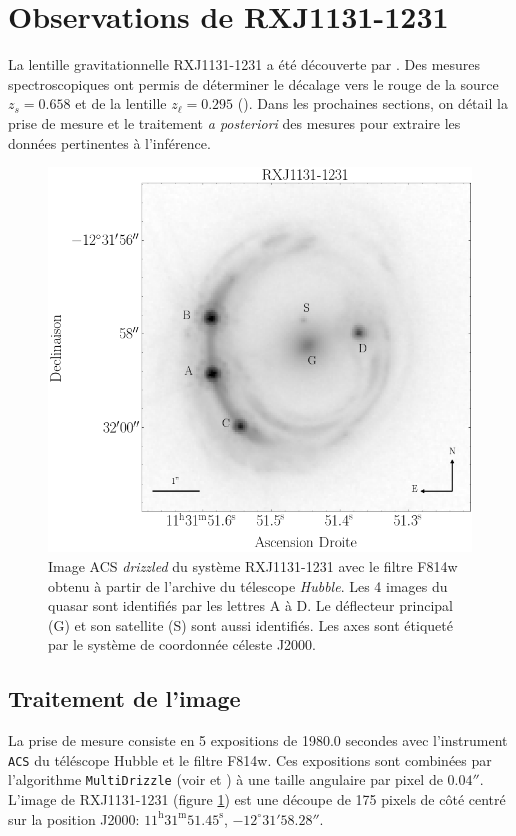 \documentclass[times,10pt,twocolumn]{article}
\begin{document}
\section{Observations de RXJ1131-1231}\label{sec:observation}
La lentille gravitationnelle RXJ1131-1231 a été découverte par 
\citet{Sluse2003}. Des mesures spectroscopiques ont permis de déterminer le 
décalage vers le rouge de la source $z_s = 0.658$ et de la lentille 
$z_\ell = 0.295$ (\citet{Sluse2003}). Dans les prochaines sections, on détail 
la prise de mesure et le traitement \textit{a posteriori} des mesures pour 
extraire les données pertinentes à l'inférence.
\begin{figure}[H]
        \centering
        \includegraphics[width=\linewidth]{good_cutout}
        \caption{Image ACS \textit{drizzled} du système RXJ1131-1231 avec le filtre F814w obtenu 
                à partir de l'archive du télescope \textit{Hubble}. Les 
        4 images du quasar sont identifiés par les lettres A à D. Le déflecteur principal (G) 
        et son satellite (S) sont aussi identifiés. Les axes sont étiqueté par le système 
        de coordonnée céleste J2000.}
        \label{fig:rxj1131}
\end{figure}

\subsection{Traitement de l'image}
La prise de mesure consiste en 5 expositions de 1980.0 secondes avec 
l'instrument \texttt{ACS} du téléscope Hubble et le filtre F814w. Ces 
expositions sont combinées par l'algorithme \texttt{MultiDrizzle} 
(voir \citet{Massey2010} et \citet{Koekemoer2007}) à une taille angulaire 
par pixel de $0.04''$. L'image de RXJ1131-1231 (figure \ref{fig:rxj1131}) 
est une découpe de 175 pixels de côté centré sur la position 
J2000: $11^{\mathrm{h}}31^{\mathrm{m}}51.45^{\mathrm{s}}$, $-12^{\circ}31'58.28''$.
\end{document}
